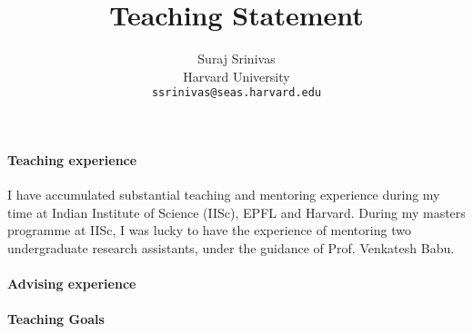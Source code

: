 \documentclass{article}
\title{Teaching Statement}
\author{Suraj Srinivas \\
    {Harvard University}\\
    \small{\texttt{ssrinivas@seas.harvard.edu}}
	}
\date{}
\begin{document}
\pagecolor{floralwhite}

\maketitle

\paragraph{Teaching experience} I have accumulated substantial teaching and mentoring experience during my time at Indian Institute of Science (IISc), 
EPFL and Harvard. During my masters programme at IISc, I was lucky to have the experience of mentoring two undergraduate 
research assistants, under the guidance of Prof. Venkatesh Babu. 

\paragraph{Advising experience}

\paragraph{Teaching Goals} 
\end{document}
